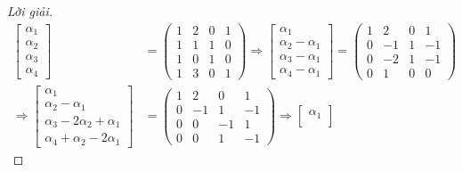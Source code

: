 \documentclass[class=linearalgebra,crop=false]{standalone}
\begin{document}
\begin{proof}[Lời giải]
    \begin{align*}
        \begin{bmatrix}
            \alpha_{1} \\
            \alpha_{2} \\
            \alpha_{3} \\
            \alpha_{4}
        \end{bmatrix}&=
        \begin{pmatrix}
            1 & 2 & 0 & 1 \\
            1 & 1 & 1 & 0 \\
            1 & 0 & 1 & 0 \\
            1 & 3 & 0 & 1
        \end{pmatrix}
        \Longrightarrow
        \begin{bmatrix}
            \alpha_{1} \\
            \alpha_{2} - \alpha_{1} \\
            \alpha_{3} - \alpha_{1} \\
            \alpha_{4} - \alpha_{1}
        \end{bmatrix}=
        \begin{pmatrix}
            1 & 2 & 0 & 1 \\
            0 & -1 & 1 & -1 \\
            0 & -2 & 1 & -1 \\
            0 & 1 & 0 & 0
        \end{pmatrix} \\
        \Longrightarrow
        \begin{bmatrix}
            \alpha_{1} \\
            \alpha_{2} - \alpha_{1} \\
            \alpha_{3} - 2\alpha_{2} + \alpha_{1} \\
            \alpha_{4} + \alpha_{2} - 2\alpha_{1}
        \end{bmatrix}&=
        \begin{pmatrix}
            1 & 2 & 0 & 1 \\
            0 & -1 & 1 & -1 \\
            0 & 0 & -1 & 1 \\
            0 & 0 & 1 & -1
        \end{pmatrix}
        \Longrightarrow
        \begin{bmatrix}
            \alpha_{1} \\

\end{bmatrix}
\end{align*}
\end{proof}
\end{document}
